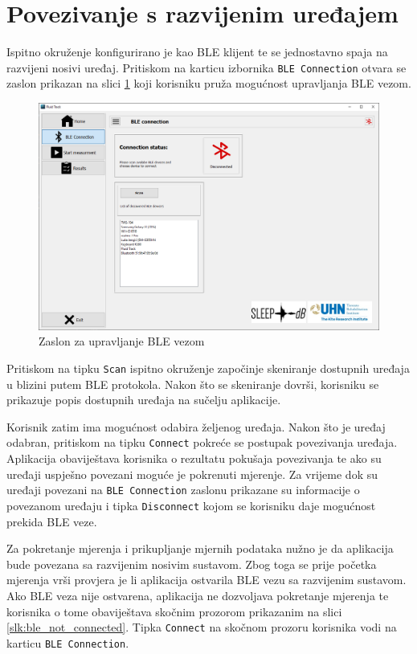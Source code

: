 \documentclass[../diplomski_rad.tex]{subfiles}
\begin{document}
\section{Povezivanje s razvijenim uređajem}

Ispitno okruženje konfigurirano je kao BLE klijent te se jednostavno spaja na razvijeni nosivi uređaj. 
Pritiskom na karticu izbornika \texttt{BLE Connection} otvara se zaslon prikazan na slici \ref{slk:ble} 
koji korisniku pruža mogućnost upravljanja BLE vezom.

\begin{figure}[htb]
    \centering
    \includegraphics[width=1\textwidth]{Figures/ble.png} 
    \caption{Zaslon za upravljanje BLE vezom}
    \label{slk:ble}
\end{figure}


Pritiskom na tipku \texttt{Scan}  ispitno okruženje započinje skeniranje dostupnih uređaja 
u blizini putem BLE protokola. 
Nakon što se skeniranje dovrši, korisniku se prikazuje popis dostupnih uređaja na sučelju aplikacije.

Korisnik zatim ima mogućnost odabira željenog uređaja. Nakon što je uređaj odabran, pritiskom na tipku \texttt{Connect} 
pokreće se postupak povezivanja uređaja. 
Aplikacija obaviještava korisnika o rezultatu pokušaja povezivanja te ako su uređaji uspješno povezani moguće je pokrenuti mjerenje.  
Za vrijeme dok su uređaji povezani na \texttt{BLE Connection} zaslonu prikazane su informacije o povezanom uređaju 
i tipka \texttt{Disconnect} kojom se korisniku daje mogućnost prekida BLE veze.

Za pokretanje mjerenja i prikupljanje mjernih podataka nužno je da aplikacija bude povezana sa razvijenim nosivim sustavom. 
Zbog toga se prije početka mjerenja vrši provjera je li aplikacija ostvarila BLE vezu sa razvijenim sustavom. 
Ako BLE veza nije ostvarena, aplikacija ne dozvoljava pokretanje mjerenja te korisnika o tome obaviještava 
skočnim prozorom prikazanim na slici \ref{slk:ble_not_connected}. Tipka \texttt{Connect} na skočnom prozoru korisnika 
vodi na karticu \texttt{BLE Connection}.
\end{document}
